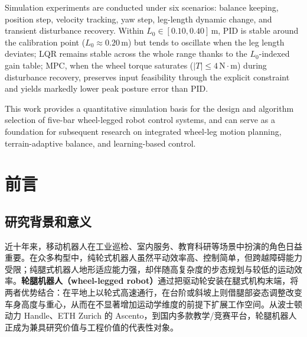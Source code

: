 \documentclass{smbuthesis}
\begin{document}
\begin{abstractEN}
Simulation experiments are conducted under six scenarios: balance keeping, position step, velocity tracking, yaw step, leg-length dynamic change, and transient disturbance recovery. Within $L_0 \in [0.10, 0.40]\,\mathrm{m}$, PID is stable around the calibration point ($L_0 \approx 0.20\,\mathrm{m}$) but tends to oscillate when the leg length deviates; LQR remains stable across the whole range thanks to the $L_0$-indexed gain table; MPC, when the wheel torque saturates ($|T| \le 4\,\mathrm{N\cdot m}$) during disturbance recovery, preserves input feasibility through the explicit constraint and yields markedly lower peak posture error than PID.

This work provides a quantitative simulation basis for the design and algorithm selection of five-bar wheel-legged robot control systems, and can serve as a foundation for subsequent research on integrated wheel-leg motion planning, terrain-adaptive balance, and learning-based control.

\end{abstractEN}

\printtitle
{}

\chapter{前言}

\section{研究背景和意义}

近十年来，移动机器人在工业巡检、室内服务、教育科研等场景中扮演的角色日益重要。在众多构型中，纯轮式机器人虽然平动效率高、控制简单，但跨越障碍能力受限；纯腿式机器人地形适应能力强，却伴随高复杂度的步态规划与较低的运动效率。\textbf{轮腿机器人（wheel-legged robot）}通过把驱动轮安装在腿式机构末端，将两者优势结合：在平地上以轮式高速通行，在台阶或斜坡上则借腿部姿态调整改变车身高度与重心，从而在不显著增加运动学维度的前提下扩展工作空间\cite{Bjelonic2019KeepRollin,Klemm2019Ascento,Wang2021WheelLegged}。从波士顿动力 Handle、ETH Zurich 的 Ascento，到国内多款教学/竞赛平台，轮腿机器人正成为兼具研究价值与工程价值的代表性对象。
\end{document}
